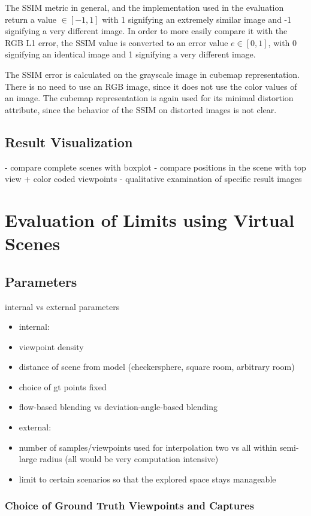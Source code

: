 The SSIM metric in general, and the implementation used in the evaluation return a value $\in [-1, 1]$ with 1 signifying an extremely similar image and -1 signifying a very different image. In order to more easily compare it with the RGB L1 error, the SSIM value is converted to an error value $ e \in [0,1]$, with 0 signifying an identical image and 1 signifying a very different image.

The SSIM error is calculated on the grayscale image in cubemap representation. There is no need to use an RGB image, since it does not use the color values of an image. The cubemap representation is again used for its minimal distortion attribute, since the behavior of the SSIM on distorted images is not clear.

\subsection{Result Visualization}
- compare complete scenes with boxplot
- compare positions in the scene with top view + color coded viewpoints
- qualitative examination of specific result images

\section{Evaluation of Limits using Virtual Scenes}

\subsection{Parameters}
internal vs external parameters
\begin{itemize}
  \item internal:
  \item viewpoint density
  \item distance of scene from model (checkersphere, square room, arbitrary room)
  \item choice of gt points \ar fixed
  \item flow-based blending vs deviation-angle-based blending
  \item external:
  \item number of samples/viewpoints used for interpolation \ar two vs all within semi-large radius (all would be very computation intensive)
  \item limit to certain scenarios so that the explored space stays manageable
\end{itemize}

\subsubsection{Choice of Ground Truth Viewpoints and Captures}

